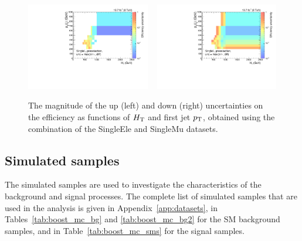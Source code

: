 \begin{figure}[htpb]
\centering
\includegraphics[width=0.48\textwidth]
{figures/razor_trigger/h_HT_j1pt_0_pre_errdiff_up_ph_l_forThesis}
~
\includegraphics[width=0.48\textwidth]
{figures/razor_trigger/h_HT_j1pt_0_pre_errdiff_low_ph_l_forThesis}
\caption{The magnitude of the up (left) and down (right) uncertainties on the efficiency as 
functions of $H_{\mathrm{T}}$ and first jet $p_{\mathrm{T}}$, obtained using the combination of the SingleEle and SingleMu 
datasets. 
\label{fig:boost_trigger_efficiency_unc}}
\end{figure}



\subsection{Simulated samples \label{sec:boost_mc_samples}}

The simulated samples are used to investigate the characteristics of the background and signal
processes.  The complete list of simulated samples that are used in the analysis is given in
Appendix~\ref{app:datasets}, in Tables~\ref{tab:boost_mc_bg} and \ref{tab:boost_mc_bg2} for the SM
background samples, and in Table~\ref{tab:boost_mc_sms} for the signal samples. 

